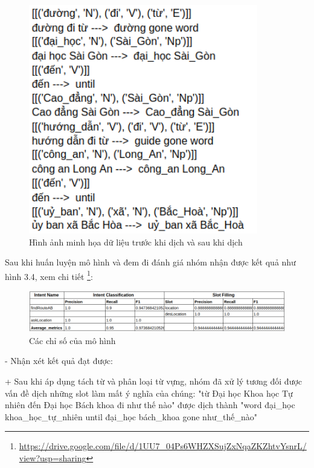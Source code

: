  \begin{figure}[htp]
              \centering
              \includegraphics[width=10cm]{images/trainingdata-wordsegment.png} 
              \caption{Hình ảnh minh họa dữ liệu trước khi dịch và sau khi dịch}
              \label{fig:sodohethongchiduong}

          \end{figure} 
	



Sau khi huấn luyện mô hình và đem đi đánh giá nhóm nhận được kết quả như  hình 3.4, xem chi tiết \footnote{\url{https://drive.google.com/file/d/1UU7_04Ps6WHZXSujZxNqaZKZhtvYsnrL/view?usp=sharing}}:
	
  \begin{figure}[htp]
              \centering
              \includegraphics[width=15cm]{images/metrics-dich-tung-t.png} 
              \caption{Các chỉ số của mô hình}
              \label{fig:sodohethongchiduong}

          \end{figure} 

- Nhận xét kết quả đạt được:

 + Sau khi áp dụng tách từ và phân loại từ vựng, nhóm đã xử lý tương đối được vấn đề dịch những slot làm mất ý nghĩa của chúng:
"từ Đại học Khoa học Tự nhiên đến Đại học Bách khoa đi như thế nào" được dịch thành "word đại\_học khoa\_học\_tự\_nhiên until đại\_học bách\_khoa gone như\_thế\_nào"

